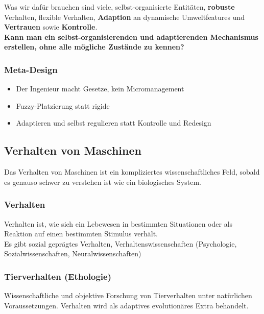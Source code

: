 \documentclass[a4paper]{article}
\begin{document}
Was wir dafür brauchen sind viele, selbst-organisierte Entitäten, \textbf{robuste} Verhalten, flexible Verhalten, \textbf{Adaption} an dynamische Umweltfeatures und \textbf{Vertrauen} sowie \textbf{Kontrolle}. \\

\textbf{Kann man ein selbst-organisierenden und adaptierenden Mechanismus erstellen, ohne alle mögliche Zustände zu kennen?}
\subsubsection{Meta-Design}
\begin{itemize}
	\item Der Ingenieur macht Gesetze, kein Micromanagement
	\item Fuzzy-Platzierung statt rigide
	\item Adaptieren und selbst regulieren statt Kontrolle und Redesign
\end{itemize}
\subsection{Verhalten von Maschinen}
Das Verhalten von Maschinen ist ein kompliziertes wissenschaftliches Feld, sobald es genauso schwer zu verstehen ist wie ein biologisches System.
\subsubsection{Verhalten}
Verhalten ist, wie sich ein Lebewesen in bestimmten Situationen oder als Reaktion auf einen bestimmten Stimulus verhält.\\

Es gibt sozial geprägtes Verhalten, Verhaltenswissenschaften (Psychologie, Sozialwissenschaften, Neuralwissenschaften)
\subsubsection{Tierverhalten (Ethologie)} 	
Wissenschaftliche und objektive Forschung von Tierverhalten unter natürlichen Voraussetzungen. Verhalten wird als adaptives evolutionäres Extra behandelt.
\end{document}
